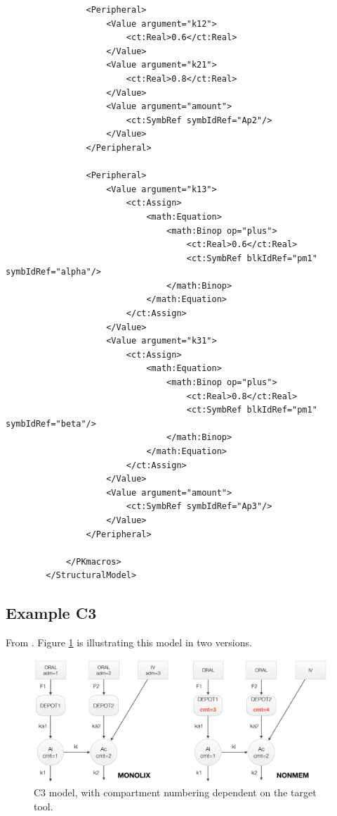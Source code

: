\begin{lstlisting}
                <Peripheral>
                    <Value argument="k12">
                        <ct:Real>0.6</ct:Real>
                    </Value>
                    <Value argument="k21">
                        <ct:Real>0.8</ct:Real>
                    </Value>
                    <Value argument="amount">
                        <ct:SymbRef symbIdRef="Ap2"/>
                    </Value>
                </Peripheral>
                
                <Peripheral>
                    <Value argument="k13">
                        <ct:Assign>
                            <math:Equation>
                                <math:Binop op="plus">
                                    <ct:Real>0.6</ct:Real>
                                    <ct:SymbRef blkIdRef="pm1" symbIdRef="alpha"/>
                                </math:Binop>
                            </math:Equation>
                        </ct:Assign>
                    </Value>
                    <Value argument="k31">
                        <ct:Assign>
                            <math:Equation>
                                <math:Binop op="plus">
                                    <ct:Real>0.8</ct:Real>
                                    <ct:SymbRef blkIdRef="pm1" symbIdRef="beta"/>
                                </math:Binop>
                            </math:Equation>
                        </ct:Assign>
                    </Value>
                    <Value argument="amount">
                        <ct:SymbRef symbIdRef="Ap3"/>
                    </Value>
                </Peripheral>
                
            </PKmacros>
        </StructuralModel>
\end{lstlisting}



\subsection{Example C3}
From \cite{MLXTRANforMonolix:2014}. Figure \ref{fig:ComplexModel3} is illustrating this model in two versions. 

\begin{figure}[htbp]
\centering
 \includegraphics[width=160mm]{pics/ComplexModel3}
\caption{C3 model, with compartment numbering dependent on the target tool.}
\label{fig:ComplexModel3}
\end{figure}


